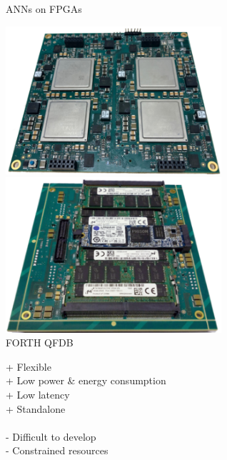 \begin{frame}{ANNs on FPGAs}
	\begin{minipage}{0.4\textwidth}
		\centering
		\includegraphics[width=0.6\textwidth]{../Images/Hardware/QFDB-top.png}\\
		\includegraphics[width=0.6\textwidth]{../Images/Hardware/QFDB-bottom.png}\\
		FORTH QFDB
	\end{minipage}%
	\begin{minipage}{0.6\textwidth}
		+ Flexible\\
		+ Low power \& energy consumption\\
		+ Low latency\\
		+ Standalone\\\\
		- Difficult to develop\\
		- Constrained resources\\
	\end{minipage}
\end{frame}
